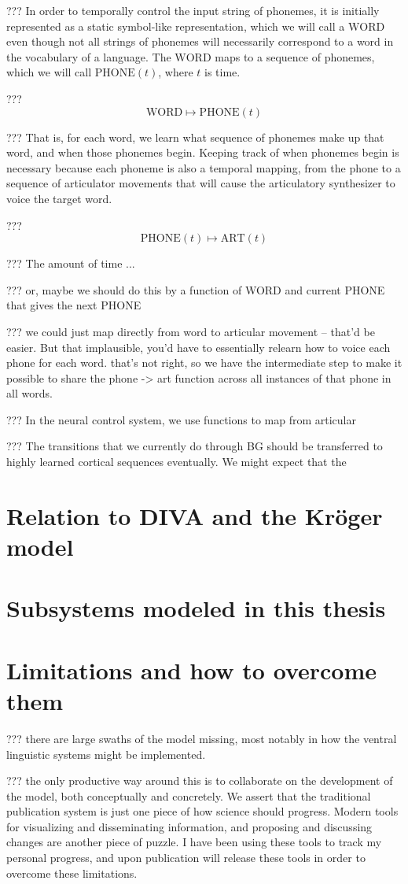 ??? In order to temporally control
the input string of phonemes,
it is initially represented
as a static symbol-like representation,
which we will call a $\text{WORD}$
even though not all strings of phonemes
will necessarily correspond
to a word in the vocabulary of a language.
The $\text{WORD}$ maps to a
sequence of phonemes,
which we will call
$\text{PHONE}(t)$,
where $t$ is time.

??? $$\text{WORD} \mapsto \text{PHONE}(t)$$

??? That is, for each word, we learn
what sequence of phonemes make up that word,
and when those phonemes begin.
Keeping track of when phonemes begin
is necessary because
each phoneme is also a temporal mapping,
from the phone to
a sequence of articulator movements
that will cause the articulatory synthesizer
to voice the target word.

??? $$\text{PHONE}(t) \mapsto \text{ART}(t)$$

??? The amount of time ...

??? or, maybe we should do this by
a function of WORD and current PHONE
that gives the next PHONE

??? we could just map directly from word
to articular movement -- that'd be easier.
But that implausible, you'd have to
essentially relearn how to voice each phone
for each word. that's not right, so we
have the intermediate step to make it
possible to share the phone -> art
function across all instances of that phone
in all words.

??? In the neural control system,
we use functions to map from
articular

??? The transitions that we currently do through
BG should be transferred to highly learned
cortical sequences eventually.
We might expect that the

\section{Relation to DIVA and the Kr\"{o}ger model}

\section{Subsystems modeled in this thesis}

\section{Limitations and how to overcome them}

??? there are large swaths of the model missing,
most notably in how the ventral linguistic systems
might be implemented.

??? the only productive way around this is to
collaborate on the development of the model,
both conceptually and concretely.
We assert that
the traditional publication system
is just one piece of how science should progress.
Modern tools for visualizing
and disseminating information,
and proposing and discussing changes
are another piece of puzzle.
I have been using these tools
to track my personal progress,
and upon publication
will release these tools
in order to overcome these limitations.
